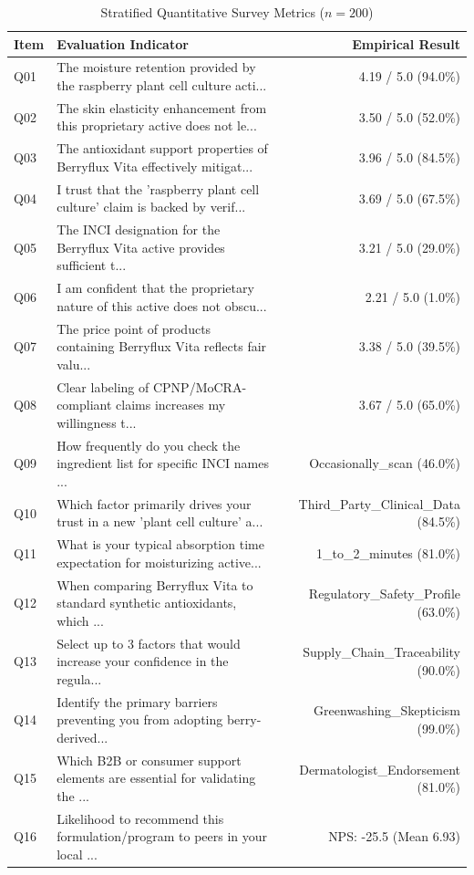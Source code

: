 \documentclass[10pt,twocolumn,a4paper]{article}
\begin{document}
\begin{table}[t]
\centering
\caption{Stratified Quantitative Survey Metrics ($n = 200$)}
\label{tab:metrics}
\small
\begin{tabularx}{\textwidth}{l X r}
\toprule
\textbf{Item} & \textbf{Evaluation Indicator} & \textbf{Empirical Result} \\
\midrule
Q01 & The moisture retention provided by the raspberry plant cell culture acti... & 4.19 / 5.0 (94.0\%) \\
Q02 & The skin elasticity enhancement from this proprietary active does not le... & 3.50 / 5.0 (52.0\%) \\
Q03 & The antioxidant support properties of Berryflux Vita effectively mitigat... & 3.96 / 5.0 (84.5\%) \\
Q04 & I trust that the 'raspberry plant cell culture' claim is backed by verif... & 3.69 / 5.0 (67.5\%) \\
Q05 & The INCI designation for the Berryflux Vita active provides sufficient t... & 3.21 / 5.0 (29.0\%) \\
Q06 & I am confident that the proprietary nature of this active does not obscu... & 2.21 / 5.0 (1.0\%) \\
Q07 & The price point of products containing Berryflux Vita reflects fair valu... & 3.38 / 5.0 (39.5\%) \\
Q08 & Clear labeling of CPNP/MoCRA-compliant claims increases my willingness t... & 3.67 / 5.0 (65.0\%) \\
Q09 & How frequently do you check the ingredient list for specific INCI names ... & Occasionally\_scan (46.0\%) \\
Q10 & Which factor primarily drives your trust in a new 'plant cell culture' a... & Third\_Party\_Clinical\_Data (84.5\%) \\
Q11 & What is your typical absorption time expectation for moisturizing active... & 1\_to\_2\_minutes (81.0\%) \\
Q12 & When comparing Berryflux Vita to standard synthetic antioxidants, which ... & Regulatory\_Safety\_Profile (63.0\%) \\
Q13 & Select up to 3 factors that would increase your confidence in the regula... & Supply\_Chain\_Traceability (90.0\%) \\
Q14 & Identify the primary barriers preventing you from adopting berry-derived... & Greenwashing\_Skepticism (99.0\%) \\
Q15 & Which B2B or consumer support elements are essential for validating the ... & Dermatologist\_Endorsement (81.0\%) \\
Q16 & Likelihood to recommend this formulation/program to peers in your local ... & NPS: -25.5 (Mean 6.93) \\
\bottomrule
\end{tabularx}
\end{table}
\end{document}
